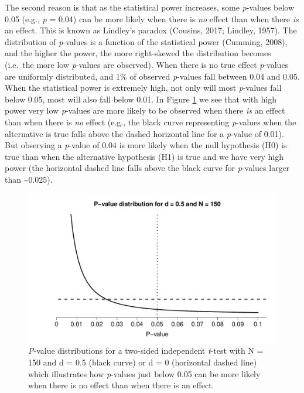 \documentclass[
  english,
  ,jou, a4paper,floatsintext]{apa6}
\begin{document}
The second reason is that as the statistical power increases, some \emph{p}-values below 0.05 (e.g., \emph{p} = 0.04) can be more likely when there is \emph{no} effect than when there \emph{is} an effect. This is known as Lindley's paradox (Cousins, 2017; Lindley, 1957). The distribution of \emph{p}-values is a function of the statistical power (Cumming, 2008), and the higher the power, the more right-skewed the distribution becomes (i.e.~the more low \emph{p}-values are observed). When there is no true effect \emph{p}-values are uniformly distributed, and 1\% of observed \emph{p}-values fall between 0.04 and 0.05. When the statistical power is extremely high, not only will most \emph{p}-values fall below 0.05, most will also fall below 0.01. In Figure \ref{fig:p-plot} we see that with high power very low \emph{p}-values are more likely to be observed when there \emph{is} an effect than when there is \emph{no} effect (e.g., the black curve representing \emph{p}-values when the alternative is true falls above the dashed horizontal line for a \emph{p}-value of 0.01). But observing a \emph{p}-value of 0.04 is more likely when the null hypothesis (H0) is true than when the alternative hypothesis (H1) is true and we have very high power (the horizontal dashed line falls above the black curve for \emph{p}-values larger than \textasciitilde0.025).

\begin{figure}
\centering
\includegraphics{Justify_in_Practice_files/figure-latex/p-plot-1.pdf}
\caption{\label{fig:p-plot}\emph{P}-value distributions for a two-sided independent \emph{t}-test with N = 150 and d = 0.5 (black curve) or d = 0 (horizontal dashed line) which illustrates how \emph{p}-values just below 0.05 can be more likely when there is no effect than when there is an effect.}
\end{figure}
\end{document}
